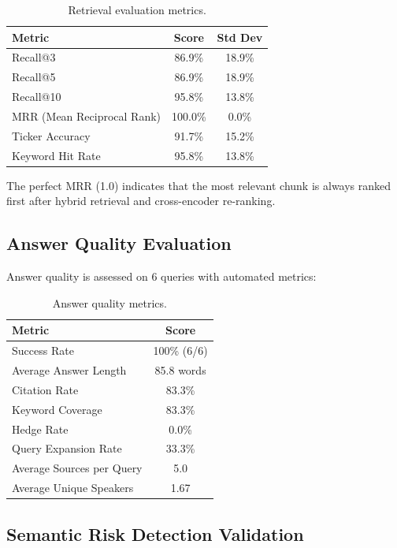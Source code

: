 \documentclass[12pt,a4paper]{article}
\begin{document}
\begin{table}[H]
\centering
\caption{Retrieval evaluation metrics.}
\label{tab:retrieval-eval}
\begin{tabular}{@{}lcc@{}}
\toprule
\textbf{Metric} & \textbf{Score} & \textbf{Std Dev} \\
\midrule
Recall@3 & 86.9\% & 18.9\% \\
Recall@5 & 86.9\% & 18.9\% \\
Recall@10 & 95.8\% & 13.8\% \\
MRR (Mean Reciprocal Rank) & 100.0\% & 0.0\% \\
Ticker Accuracy & 91.7\% & 15.2\% \\
Keyword Hit Rate & 95.8\% & 13.8\% \\
\bottomrule
\end{tabular}
\end{table}

The perfect MRR (1.0) indicates that the most relevant chunk is always ranked first after hybrid retrieval and cross-encoder re-ranking.

\subsection{Answer Quality Evaluation}

Answer quality is assessed on 6 queries with automated metrics:

\begin{table}[H]
\centering
\caption{Answer quality metrics.}
\label{tab:answer-eval}
\begin{tabular}{@{}lc@{}}
\toprule
\textbf{Metric} & \textbf{Score} \\
\midrule
Success Rate & 100\% (6/6) \\
Average Answer Length & 85.8 words \\
Citation Rate & 83.3\% \\
Keyword Coverage & 83.3\% \\
Hedge Rate & 0.0\% \\
Query Expansion Rate & 33.3\% \\
Average Sources per Query & 5.0 \\
Average Unique Speakers & 1.67 \\
\bottomrule
\end{tabular}
\end{table}

\subsection{Semantic Risk Detection Validation}
\end{document}
